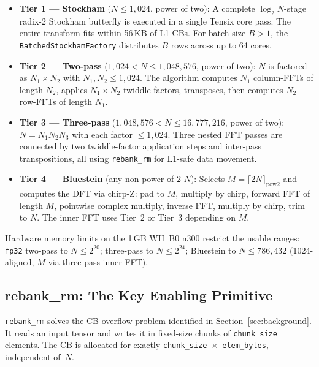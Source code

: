 \documentclass[conference]{IEEEtran}
\begin{document}
\begin{itemize}

\item \textbf{Tier 1 — Stockham} ($N \leq 1{,}024$, power of two):
  A complete $\log_2 N$-stage radix-2 Stockham butterfly is executed in a single
  Tensix core pass. The entire transform fits within 56\,KB of L1 CBs. For
  batch size $B > 1$, the \texttt{BatchedStockhamFactory} distributes $B$ rows
  across up to 64 cores.

\item \textbf{Tier 2 — Two-pass} ($1{,}024 < N \leq 1{,}048{,}576$, power of two):
  $N$ is factored as $N_1 \times N_2$ with $N_1, N_2 \leq 1{,}024$. The algorithm
  computes $N_1$ column-FFTs of length $N_2$, applies $N_1 \times N_2$ twiddle
  factors, transposes, then computes $N_2$ row-FFTs of length $N_1$.

\item \textbf{Tier 3 — Three-pass} ($1{,}048{,}576 < N \leq 16{,}777{,}216$, power of two):
  $N = N_1 N_2 N_3$ with each factor $\leq 1{,}024$. Three nested FFT passes are
  connected by two twiddle-factor application steps and inter-pass transpositions,
  all using \texttt{rebank\_rm} for L1-safe data movement.

\item \textbf{Tier 4 — Bluestein} (any non-power-of-2 $N$):
  Selects $M = \lceil 2N \rceil_{\text{pow2}}$ and computes the DFT via chirp-Z:
  pad to $M$, multiply by chirp, forward FFT of length $M$, pointwise complex
  multiply, inverse FFT, multiply by chirp, trim to $N$. The inner FFT uses
  Tier~2 or Tier~3 depending on $M$.

\end{itemize}

Hardware memory limits on the 1\,GB WH~B0 n300 restrict the usable ranges:
\texttt{fp32} two-pass to $N \leq 2^{20}$; three-pass to $N \leq 2^{24}$;
Bluestein to $N \leq 786{,}432$ (1024-aligned, $M$ via three-pass inner FFT).

\subsection{rebank\_rm: The Key Enabling Primitive}

\texttt{rebank\_rm} solves the CB overflow problem identified in
Section~\ref{sec:background}. It reads an input tensor and writes it in
fixed-size chunks of \texttt{chunk\_size} elements. The CB is allocated for
exactly \texttt{chunk\_size}~$\times$~\texttt{elem\_bytes}, independent of~$N$.
\end{document}
